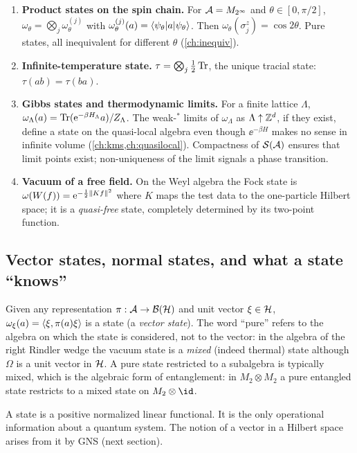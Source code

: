 \begin{enumerate}
\item \textbf{Product states on the spin chain.} For $\mathcal{A}=M_{2^\infty}$ and $\theta\in[0,\pi/2]$, $\omega_\theta=\bigotimes_j\omega^{(j)}_\theta$ with $\omega^{(j)}_\theta(a)=\langle \psi_\theta\rvert a\lvert \psi_\theta\rangle$. Then $\omega_\theta(\sigma^z_j)=\cos2\theta$. Pure states, all inequivalent for different $\theta$ (\cref{ch:inequiv}).
\item \textbf{Infinite-temperature state.} $\tau=\bigotimes_j\tfrac12\operatorname{Tr}$, the unique tracial state: $\tau(ab)=\tau(ba)$.
\item \textbf{Gibbs states and thermodynamic limits.} For a finite lattice $\Lambda$, $\omega_\Lambda(a)=\operatorname{Tr}(\mathrm{e}^{-\beta H_\Lambda}a)/Z_\Lambda$. The weak-$^*$ limits of $\omega_\Lambda$ as $\Lambda\uparrow\mathbb{Z}^d$, if they exist, define a state on the quasi-local algebra even though $\ee^{-\beta H}$ makes no sense in infinite volume (\cref{ch:kms,ch:quasilocal}). Compactness of $\mathcal S(\mathcal{A})$ ensures that limit points exist; non-uniqueness of the limit signals a phase transition.
\item \textbf{Vacuum of a free field.} On the Weyl algebra the Fock state is $\omega(W(f))=\mathrm{e}^{-\frac12\lVert Kf\rVert^2}$ where $K$ maps the test data to the one-particle Hilbert space; it is a \emph{quasi-free} state, completely determined by its two-point function.
\end{enumerate}

\subsection{Vector states, normal states, and what a state ``knows''}

Given any representation $\pi:\mathcal{A}\to\mathcal{B}(\mathcal{H})$ and unit vector $\xi\in\mathcal{H}$, $\omega_\xi(a)=\langle \xi,\pi(a)\xi\rangle$ is a state (a \emph{vector state}). The word ``pure'' refers to the algebra on which the state is considered, not to the vector: in the algebra of the right Rindler wedge the vacuum state is a \emph{mixed} (indeed thermal) state although $\Omega$ is a unit vector in $\mathcal{H}$. A pure state restricted to a subalgebra is typically mixed, which is the algebraic form of entanglement: in $M_2\otimes M_2$ a pure entangled state restricts to a mixed state on $M_2\otimes\id$.

\begin{keyidea}
A state is a positive normalized linear functional. It is the only operational information about a quantum system. The notion of a vector in a Hilbert space arises from it by GNS (next section).
\end{keyidea}

